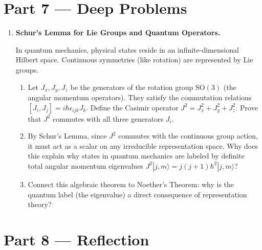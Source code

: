 \documentclass[12pt, a4paper]{article}
\begin{document}
\newpage

\section{Part 7 --- Deep Problems}

\begin{enumerate}[label=\textbf{D\arabic*.}]
  \item \textbf{Schur's Lemma for Lie Groups and Quantum Operators.}
  
        In quantum mechanics, physical states reside in an infinite-dimensional Hilbert space. Continuous symmetries (like rotation) are represented by Lie groups.
        \begin{enumerate}[label=(\alph*)]
          \item Let $J_x, J_y, J_z$ be the generators of the rotation group $\text{SO}(3)$ (the angular momentum operators). They satisfy the commutation relations $[J_i, J_j] = i\hbar \epsilon_{ijk} J_k$.
                Define the Casimir operator $J^2 = J_x^2 + J_y^2 + J_z^2$.
                Prove that $J^2$ commutes with all three generators $J_i$.
          \item By Schur's Lemma, since $J^2$ commutes with the continuous group action, it must act as a scalar on any irreducible representation space.
                Why does this explain why states in quantum mechanics are labeled by definite total angular momentum eigenvalues $J^2 |j, m\rangle = j(j+1)\hbar^2 |j, m\rangle$?
          \item Connect this algebraic theorem to Noether's Theorem: why is the quantum label (the eigenvalue) a direct consequence of representation theory?
        \end{enumerate}
\end{enumerate}

\newpage

\section{Part 8 --- Reflection}
\end{document}
